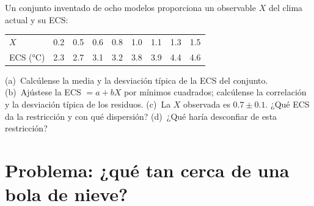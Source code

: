 \begin{exercise}[$\star\star\star$]\label{exo:b3:climate-models:12}
Un conjunto inventado de ocho modelos proporciona un observable $X$ del
clima actual y su ECS:
\begin{center}
\begin{tabular}{l*{8}{c}}
\hline
$X$ & 0.2 & 0.5 & 0.6 & 0.8 & 1.0 & 1.1 & 1.3 & 1.5\\
ECS (\unit{\celsius}) & 2.3 & 2.7 & 3.1 & 3.2 & 3.8 & 3.9 & 4.4 & 4.6\\
\hline
\end{tabular}
\end{center}
(a)~Calcúlense la media y la desviación típica de la ECS del
conjunto. (b)~Ajústese la ECS $= a + bX$ por mínimos cuadrados; calcúlense la correlación
y la desviación típica de los residuos. (c)~La $X$ observada es $0.7
\pm 0.1$. ¿Qué ECS da la restricción y con qué dispersión?
(d)~¿Qué haría desconfiar de esta restricción?
\end{exercise}

\section{Problema: ¿qué tan cerca de una bola de nieve?}

